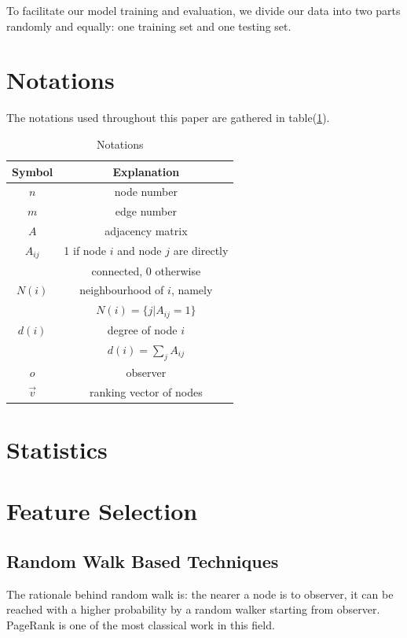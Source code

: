\documentclass[11pt,a4paper]{article}
\begin{document}
To facilitate our model training and evaluation, 
we divide our data into two parts randomly and equally: 
one training set and one testing set. 

\section{Notations}

The notations used throughout this paper are gathered 
in table(\ref{tbl:notation}). 

\begin{table}[htb]
	\centering
	\caption{Notations}
	\label{tbl:notation}
	\begin{tabular}{c|c}
	\hline
	Symbol & Explanation \\
	\hline
	$n$ & node number \\
	$m$ & edge number \\
	$A$ & adjacency matrix \\
	$A_{ij}$ & 1 if node $i$ and node $j$ are directly \\
	& connected, 0 otherwise\\
	$N(i)$ & neighbourhood of $i$, namely \\
	& $N(i) = \{j | A_{ij} = 1 \}$ \\
	$d(i)$ & degree of node $i$ \\
	& $d(i) = \sum_{j}{A_{ij}}$ \\
	$o$ & observer \\
	$\overrightarrow{v}$ & ranking vector of nodes \\
	\hline
	\end{tabular}
\end{table}


\section{Statistics}

\section{Feature Selection}

\subsection{Random Walk Based Techniques}

The rationale behind random walk is: the nearer a node
is to observer, it can be reached with a higher probability by a random 
	walker starting from observer. PageRank is one of the most classical work 
	in this field.
\end{document}
